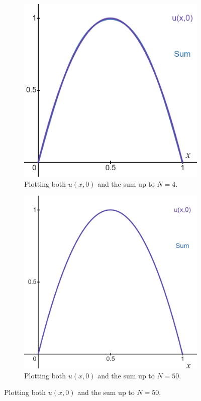 \documentclass[12pt]{article} %
\begin{document}
\begin{solution}
\begin{enumerate}[(a)]
\begin{figure}[H]
\begin{subfigure}[b]{0.3\textwidth}
        \includegraphics[width=\textwidth]{figures/sum_n4.png}
        \caption{Plotting both $u(x,0)$ and the sum up to $N=4$.}
    \end{subfigure}
    \hfill
    \begin{subfigure}[b]{0.3\textwidth}
        \centering
        \includegraphics[width=\textwidth]{figures/sum_n50.png}
        \caption{Plotting both $u(x,0)$ and the sum up to $N=50$.}
    \end{subfigure}
    \end{figure}


\end{enumerate}
\end{solution}
\end{document}
